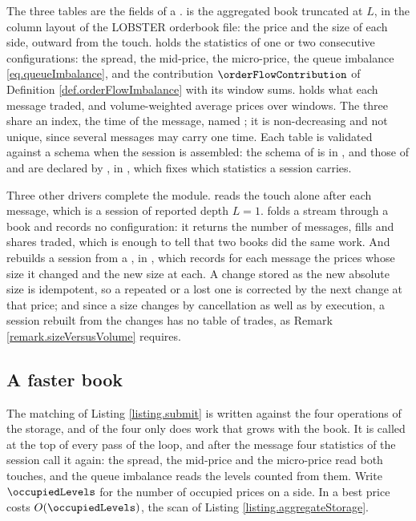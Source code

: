 The three tables are the fields of a .
 is the aggregated book truncated at $L$,
in the column layout of the LOBSTER orderbook file:
the price and the size of each side, outward from the touch.
 holds the statistics of one or two consecutive configurations:
the spread, the mid-price, the micro-price, the queue imbalance \eqref{eq.queueImbalance},
and the contribution $\orderFlowContribution$
of Definition \ref{def.orderFlowImbalance} with its window sums.
 holds what each message traded, and volume-weighted average prices over windows.
The three share an index, the time of the message, named ;
it is non-decreasing and not unique, since several messages may carry one time.
Each table is validated against a schema when the session is assembled:
the schema of  is in ,
and those of  and  are declared by ,
in , which fixes which statistics a session carries.

Three other drivers complete the module.
 reads the touch alone after each message,
which is a session of reported depth $L = 1$.
 folds a stream through a book and records no configuration:
it returns the number of messages, fills and shares traded,
which is enough to tell that two books did the same work.
And  rebuilds a session from a ,
in ,
which records for each message the prices whose size it changed and the new size at each.
A change stored as the new absolute size is idempotent,
so a repeated or a lost one is corrected by the next change at that price;
and since a size changes by cancellation as well as by execution,
a session rebuilt from the changes has no table of trades,
as Remark \ref{remark.sizeVersusVolume} requires.

\subsection{A faster book}
\label{sec.fasterBook}

The matching of Listing \ref{listing.submit}
is written against the four operations of the storage,
and of the four only  does work that grows with the book.
It is called at the top of every pass of the loop,
and after the message four statistics of the session call it again:
the spread, the mid-price and the micro-price read both touches,
and the queue imbalance reads the levels counted from them.
Write $\occupiedLevels$ for the number of occupied prices on a side.
In  a best price costs $O(\occupiedLevels)$,
the scan of Listing \ref{listing.aggregateStorage}.

